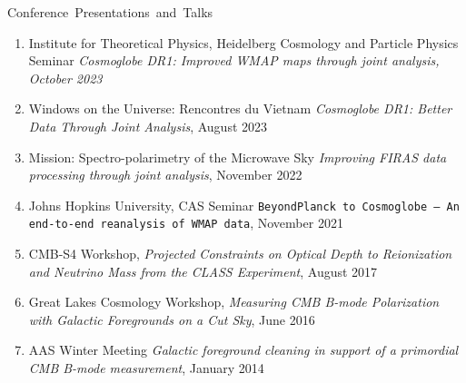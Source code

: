 \documentclass[a4paper]{resume}
\begin{document}
\begin{category}{\mbox{Conference Presentations and Talks}}
\citemnobullet
\noindent
\begin{enumerate}[topsep=0pt,itemsep=0pt,partopsep=0pt,parsep=0pt]
\item Institute for Theoretical Physics, Heidelberg Cosmology and Particle Physics Seminar
	\textit{Cosmoglobe DR1: Improved WMAP maps through joint analysis, October 2023}
\item Windows on the Universe: Rencontres du Vietnam
	\textit{Cosmoglobe DR1: Better Data Through Joint Analysis}, August 2023
\item Mission: Spectro-polarimetry of the Microwave Sky
	\textit{Improving FIRAS data processing through joint analysis}, November 2022
\item Johns Hopkins University, CAS Seminar \texttt{BeyondPlanck to Cosmoglobe -- An end-to-end
	reanalysis of WMAP data}, November 2021
\item CMB-S4 Workshop, \emph{Projected Constraints on Optical Depth to Reionization and Neutrino Mass from the CLASS Experiment}, August 2017
\item Great Lakes Cosmology Workshop, \emph{Measuring CMB B-mode Polarization
    with Galactic Foregrounds on a Cut Sky}, June 2016
\item AAS Winter Meeting 
    \emph{Galactic foreground cleaning in support of a primordial CMB B-mode measurement}, January 2014
\end{enumerate}
\end{category}

\end{document}
